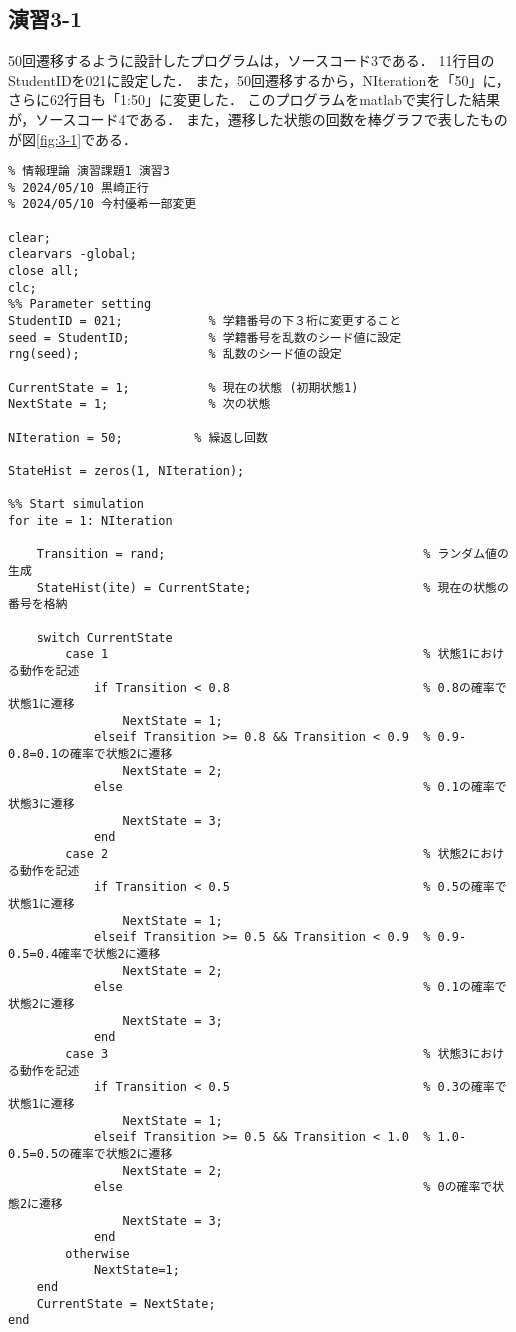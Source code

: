 \documentclass[documentclass]{jsarticle}
\begin{document}
\subsection*{演習3-1}
50回遷移するように設計したプログラムは，ソースコード3である．
11行目のStudentIDを021に設定した．
また，50回遷移するから，NIterationを「50」に，さらに62行目も「1:50」に変更した．
このプログラムをmatlabで実行した結果が，ソースコード4である．
また，遷移した状態の回数を棒グラフで表したものが図\ref*{fig:3-1}である．
\begin{lstlisting}[caption=状態変化を見るプログラム]
  % 九州工業大学情報工学部情報・通信工学科3年
% 情報理論 演習課題1 演習3
% 2024/05/10 黒崎正行
% 2024/05/10 今村優希一部変更

clear;                                 
clearvars -global;                    
close all;                            
clc;                                   
%% Parameter setting
StudentID = 021;            % 学籍番号の下３桁に変更すること
seed = StudentID;           % 学籍番号を乱数のシード値に設定
rng(seed);                  % 乱数のシード値の設定

CurrentState = 1;           % 現在の状態 (初期状態1)
NextState = 1;              % 次の状態 

NIteration = 50;          % 繰返し回数

StateHist = zeros(1, NIteration);

%% Start simulation
for ite = 1: NIteration

    Transition = rand;                                    % ランダム値の生成
    StateHist(ite) = CurrentState;                        % 現在の状態の番号を格納

    switch CurrentState
        case 1                                            % 状態1における動作を記述
            if Transition < 0.8                           % 0.8の確率で状態1に遷移
                NextState = 1;
            elseif Transition >= 0.8 && Transition < 0.9  % 0.9-0.8=0.1の確率で状態2に遷移
                NextState = 2;
            else                                          % 0.1の確率で状態3に遷移
                NextState = 3;
            end
        case 2                                            % 状態2における動作を記述
            if Transition < 0.5                           % 0.5の確率で状態1に遷移
                NextState = 1;
            elseif Transition >= 0.5 && Transition < 0.9  % 0.9-0.5=0.4確率で状態2に遷移
                NextState = 2;
            else                                          % 0.1の確率で状態2に遷移
                NextState = 3;
            end
        case 3                                            % 状態3における動作を記述
            if Transition < 0.5                           % 0.3の確率で状態1に遷移
                NextState = 1;
            elseif Transition >= 0.5 && Transition < 1.0  % 1.0-0.5=0.5の確率で状態2に遷移
                NextState = 2;
            else                                          % 0の確率で状態2に遷移
                NextState = 3;
            end
        otherwise
            NextState=1;
    end
    CurrentState = NextState;
end


\end{lstlisting}
\end{document}
